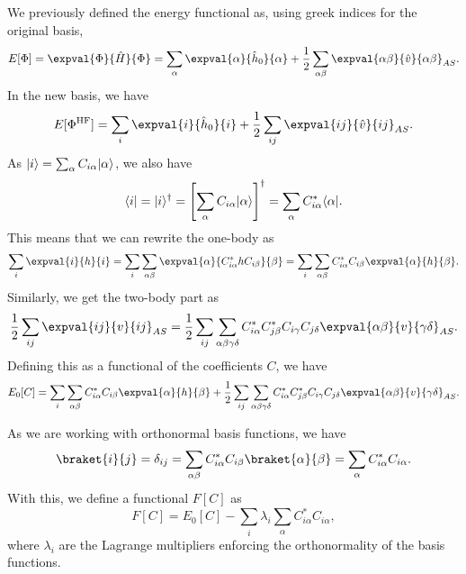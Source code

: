 \subsection{}
We previously defined the energy functional as, using greek indices for the original basis,
\begin{equation*}
    E[\Phi] = \expval{\Phi}{\hat{H}}{\Phi} = \sum_{\alpha} \expval{\alpha}{\hat{h}_0}{\alpha} + \frac{1}{2} \sum_{\alpha\beta} \expval{\alpha\beta}{\hat{v}}{\alpha \beta}_{AS}.
\end{equation*}
In the new basis, we have
\begin{equation*}
    E[\Phi^\HF] = \sum_{i} \expval{i}{\hat{h}_0}{i} + \frac{1}{2} \sum_{ij} \expval{ij}{\hat{v}}{ij}_{AS}.
\end{equation*}
As $\lvert i\rangle = \sum_{\alpha} C_{i \alpha} \lvert\alpha\rangle$, we also have
\begin{equation*}
    \langle i\rvert = \lvert i\rangle^\dagger
    = \left[ \sum_{\alpha} C_{i \alpha} \lvert\alpha\rangle \right]^\dagger
    = \sum_{\alpha} C_{i \alpha}^* \langle\alpha\rvert.
\end{equation*}
This means that we can rewrite the one-body as
\begin{align*}
    \sum_i \expval{i}{h}{i} = \sum_{i} \sum_{\alpha\beta} \expval{\alpha}{C_{i \alpha}^* h C_{i \beta}}{\beta} = \sum_{i} \sum_{\alpha\beta} C_{i \alpha}^* C_{i \beta}  \expval{\alpha}{h}{\beta}.
\end{align*}
Similarly, we get the two-body part as
\begin{equation*}
    \frac{1}{2} \sum_{ij} \expval{ij}{v}{ij}_{AS} = \frac{1}{2} \sum_{ij} \sum_{\alpha\beta\gamma\delta} C_{i \alpha}^* C_{j \beta}^* C_{i \gamma} C_{j \delta} \expval{\alpha\beta}{v}{\gamma\delta}_{AS}.
\end{equation*}
Defining this as a functional of the coefficients $C$, we have
\begin{equation}\label{eq:E0}
    E_0[C] = \sum_{i} \sum_{\alpha\beta} C_{i \alpha}^* C_{i \beta}  \expval{\alpha}{h}{\beta} + \frac{1}{2} \sum_{ij} \sum_{\alpha\beta\gamma\delta} C_{i \alpha}^* C_{j \beta}^* C_{i \gamma} C_{j \delta} \expval{\alpha\beta}{v}{\gamma\delta}_{AS}.
\end{equation}

As we are working with orthonormal basis functions, we have
\begin{equation*}
    \braket{i}{j} = \delta_{ij} = \sum_{\alpha\beta} C_{i \alpha}^* C_{i \beta} \braket{\alpha}{\beta} = \sum_{\alpha} C_{i \alpha}^* C_{i \alpha}.
\end{equation*}
With this, we define a functional $F[C]$ as
\begin{equation*}
    F[C] = E_0[C] - \sum_{i} \lambda_i \sum_{\alpha} C_{i \alpha}^* C_{i \alpha},
\end{equation*}
where $\lambda_i$ are the Lagrange multipliers enforcing the orthonormality of the basis functions.

